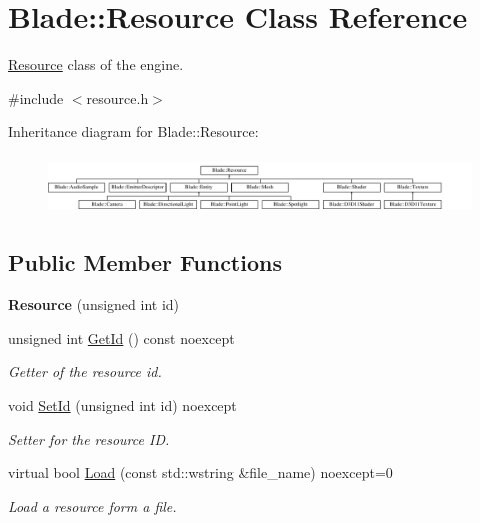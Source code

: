 \hypertarget{class_blade_1_1_resource}{}\section{Blade\+:\+:Resource Class Reference}
\label{class_blade_1_1_resource}


\hyperlink{class_blade_1_1_resource}{Resource} class of the engine.  




{\ttfamily \#include $<$resource.\+h$>$}

Inheritance diagram for Blade\+:\+:Resource\+:\begin{figure}[H]
\begin{center}
\leavevmode
\includegraphics[height=1.548387cm]{class_blade_1_1_resource}
\end{center}
\end{figure}
\subsection*{Public Member Functions}
\begin{DoxyCompactItemize}
\item 
\mbox{\label{class_blade_1_1_resource_aad67c68d5164726a1029c534fe7d003b}} 
{\bfseries Resource} (unsigned int id)
\item 
unsigned int \hyperlink{class_blade_1_1_resource_a2346c235601b0a703287bff9ad2c3432}{Get\+Id} () const noexcept
\begin{DoxyCompactList}\small\item\em Getter of the resource id. \end{DoxyCompactList}\item 
void \hyperlink{class_blade_1_1_resource_a76912ec0d2dfb35a5fffc7364b8a867d}{Set\+Id} (unsigned int id) noexcept
\begin{DoxyCompactList}\small\item\em Setter for the resource ID. \end{DoxyCompactList}\item 
virtual bool \hyperlink{class_blade_1_1_resource_ad89ab00a3b81df1338a8310ec92c5cff}{Load} (const std\+::wstring \&file\+\_\+name) noexcept=0
\begin{DoxyCompactList}\small\item\em Load a resource form a file. \end{DoxyCompactList}\end{DoxyCompactItemize}


